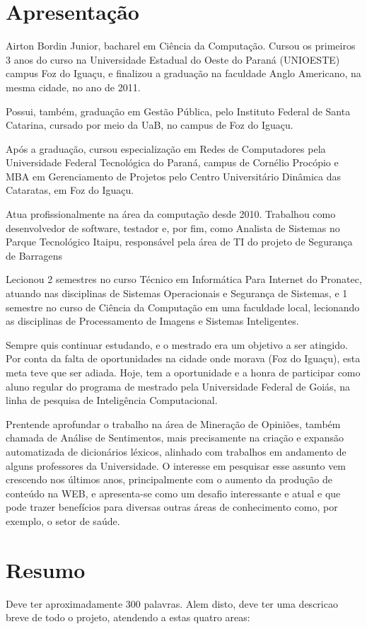 \documentclass[a4paper,11pt]{article}
\begin{document}
\section{Apresentação}
Airton Bordin Junior, bacharel em Ciência da Computação. Cursou os primeiros 3 anos do curso na Universidade Estadual do Oeste do Paraná (UNIOESTE) campus Foz do Iguaçu, e finalizou a graduação na faculdade Anglo Americano, na mesma cidade, no ano de 2011.

Possui, também, graduação em Gestão Pública, pelo Instituto Federal de Santa Catarina, cursado por meio da UaB, no campus de Foz do Iguaçu.

Após a graduação, cursou especialização em Redes de Computadores pela Universidade Federal Tecnológica do Paraná, campus de Cornélio Procópio e MBA em Gerenciamento de Projetos pelo Centro Universitário Dinâmica das Cataratas, em Foz do Iguaçu.

Atua profissionalmente na área da computação desde 2010. Trabalhou como desenvolvedor de software, testador e, por fim, como Analista de Sistemas no Parque Tecnológico Itaipu, responsável pela área de TI do projeto de Segurança de Barragens

Lecionou 2 semestres no curso Técnico em Informática Para Internet do Pronatec, atuando nas disciplinas de Sistemas Operacionais e Segurança de Sistemas, e 1 semestre no curso de Ciência da Computação em uma faculdade local, lecionando as disciplinas de Processamento de Imagens e Sistemas Inteligentes.

Sempre quis continuar estudando, e o mestrado era um objetivo a ser atingido. Por conta da falta de oportunidades na cidade onde morava (Foz do Iguaçu), esta meta teve que ser adiada. Hoje, tem a oportunidade e a honra de participar como aluno regular do programa de mestrado pela Universidade Federal de Goiás, na linha de pesquisa de Inteligência Computacional.

Prentende aprofundar o trabalho na área de Mineração de Opiniões, também chamada de Análise de Sentimentos, mais precisamente na criação e expansão automatizada de dicionários léxicos, alinhado com trabalhos em andamento de alguns professores da Universidade. O interesse em pesquisar esse assunto vem crescendo nos últimos anos, principalmente com o aumento da produção de conteúdo na WEB, e apresenta-se como um desafio interessante e atual e que pode trazer benefícios para diversas outras áreas de conhecimento como, por exemplo, o setor de saúde.

\section{Resumo}
Deve ter aproximadamente 300 palavras. Alem disto, deve ter uma descricao breve de todo o projeto, atendendo a estas quatro areas:
\end{document}
